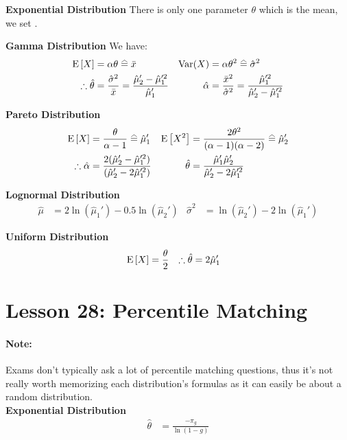 \documentclass[10pt, french]{article}
\begin{document}
\begin{multicols*}{2}
\textbf{Exponential Distribution}
There is only one parameter $\theta$ which is the mean, we set .

\textbf{Gamma Distribution}
We have:
\begin{align*}
	\esp{X}
	&=	\alpha\theta	
	\equalhat	\bar{x}	&
	\text{Var}(X)
	&=	\alpha\theta^{2}
	\equalhat	\hat{\sigma}^{2}	\\
	\therefore
	\hat{\theta}
	&=	\frac{\hat{\sigma}^{2}}{\bar{x}}	
	=	\frac{\hat{\mu}_{2}' -  \hat{\mu}_{1}'^{2}}{\hat{\mu}_{1}'}	&
	\hat{\alpha}
	&=	\frac{\bar{x}^{2}}{\hat{\sigma}^{2}}
	=	\frac{\hat{\mu}_{1}'^{2}}{\hat{\mu}_{2}' -  \hat{\mu}_{1}'^{2}}
\end{align*}

\textbf{Pareto Distribution}
\begin{align*}
	\esp{X}
	&=	\frac{\theta	}{\alpha  -  1}
	\equalhat	\hat{\mu}_{1}'	&
	\esp{X^{2}}
	&=	\frac{2\theta^{2}}{(\alpha  -  1)(\alpha - 2)}
	\equalhat	\hat{\mu}_{2}'	\\
	\therefore
	\hat{\alpha}
	&=	\frac{2(\hat{\mu}_{2}' - \hat{\mu}_{1}'^{2})}{(\hat{\mu}_{2}' - 2\hat{\mu}_{1}'^{2})}	&
	\hat{\theta}
	&=	\frac{\hat{\mu}_{1}'\hat{\mu}_{2}'}{\hat{\mu}_{2}' - 2\hat{\mu}_{1}'^{2}}
\end{align*}

\textbf{Lognormal Distribution}
\begin{align*}
	\hat{\mu}
	&=	2\ln(\hat{\mu}_{1}') - 0.5\ln(\hat{\mu}_{2}')	&
	\hat{\sigma}^{2}
	&=	\ln(\hat{\mu}_{2}') - 2\ln(\hat{\mu}_{1}')	
\end{align*}

\textbf{Uniform Distribution}
\begin{align*}
	\mathrm{E} \left[ X \right]
	&=	\frac{\theta}{2}	&
	\therefore
	\hat{\theta}
	&=	2\hat{\mu}_{1}'
\end{align*}

\section{Lesson 28: Percentile Matching}
\paragraph*{Note:}	Exams don't typically ask a lot of percentile matching questions, thus it's not really worth memorizing each distribution's formulas as it can easily be about a random distribution.\\
\textbf{Exponential Distribution}
\begin{align*}
	\hat{\theta}
	&=	\frac{-\pi_{g}}{\ln(1 - g)}
\end{align*}


\end{multicols*}
\end{document}

